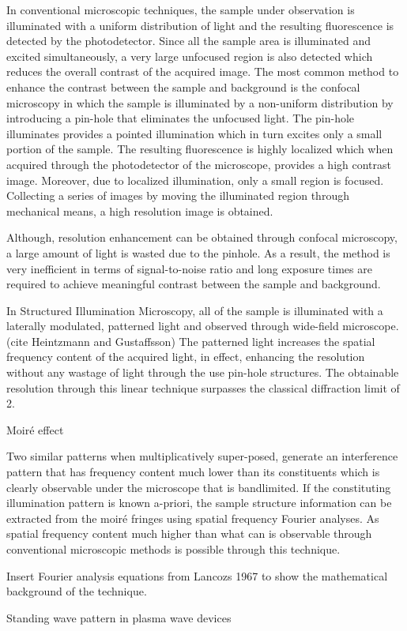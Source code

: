 \documentclass[11pt]{article}
\begin{document}
In conventional microscopic techniques, the sample under observation is illuminated with a uniform distribution of light and the resulting fluorescence is detected by the photodetector. Since all the sample area is illuminated and excited simultaneously, a very large unfocused region is also detected which reduces the overall contrast of the acquired image. The most common method to enhance the contrast between the sample and background is the confocal microscopy in which the sample is illuminated by a non-uniform distribution by introducing a pin-hole that eliminates the unfocused light. The pin-hole illuminates provides a pointed illumination which in turn excites only a small portion of the sample. The resulting fluorescence is highly localized which when acquired through the photodetector of the microscope, provides a high contrast image. Moreover, due to localized illumination, only a small region is focused. Collecting a series of images by moving the illuminated region through mechanical means, a high resolution image is obtained.

Although, resolution enhancement can be obtained through confocal microscopy, a large amount of light is wasted due to the pinhole. As a result, the method is very inefficient in terms of signal-to-noise ratio and long exposure times are required to achieve meaningful contrast between the sample and background.

In Structured Illumination Microscopy, all of the sample is illuminated with a laterally modulated, patterned light and observed through wide-field microscope. (cite Heintzmann and Gustaffsson) The patterned light increases the spatial frequency content of the acquired light, in effect, enhancing the resolution without any wastage of light through the use pin-hole structures. The obtainable resolution through this linear technique surpasses the classical diffraction limit of 2.

Moiré effect

Two similar patterns when multiplicatively super-posed, generate an interference pattern that has frequency content much lower than its constituents which is clearly observable under the microscope that is bandlimited. If the constituting illumination pattern is known a-priori, the sample structure information can be extracted from the moiré fringes using spatial frequency Fourier analyses. As spatial frequency content much higher than what can is observable through conventional microscopic methods is possible through this technique.

Insert Fourier analysis equations from Lancozs 1967 to show the mathematical background of the technique.

Standing wave pattern in plasma wave  devices
\end{document}
